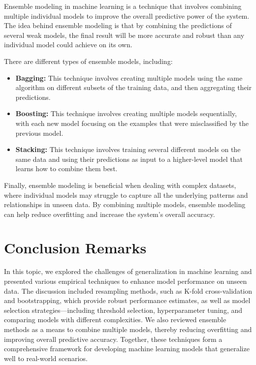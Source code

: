 \documentclass[12pt]{article}
\begin{document}
Ensemble modeling in machine learning is a technique that involves combining multiple individual models to improve the overall predictive power of the system. The idea behind ensemble modeling is that by combining the predictions of several weak models, the final result will be more accurate and robust than any individual model could achieve on its own.

There are different types of ensemble models, including:
\begin{itemize}
    \item \textbf{Bagging:} This technique involves creating multiple models using the same algorithm on different subsets of the training data, and then aggregating their predictions.
    \item \textbf{Boosting:} This technique involves creating multiple models sequentially, with each new model focusing on the examples that were misclassified by the previous model.
    \item \textbf{Stacking:} This technique involves training several different models on the same data and using their predictions as input to a higher-level model that learns how to combine them best.
\end{itemize}

Finally, ensemble modeling is beneficial when dealing with complex datasets, where individual models may struggle to capture all the underlying patterns and relationships in unseen data. By combining multiple models, ensemble modeling can help reduce overfitting and increase the system's overall accuracy.

\section{Conclusion Remarks}
In this topic, we explored the challenges of generalization in machine learning and presented various empirical techniques to enhance model performance on unseen data. The discussion included resampling methods, such as K-fold cross-validation and bootstrapping, which provide robust performance estimates, as well as model selection strategies—including threshold selection, hyperparameter tuning, and comparing models with different complexities. We also reviewed ensemble methods as a means to combine multiple models, thereby reducing overfitting and improving overall predictive accuracy. Together, these techniques form a comprehensive framework for developing machine learning models that generalize well to real-world scenarios.
\end{document}
